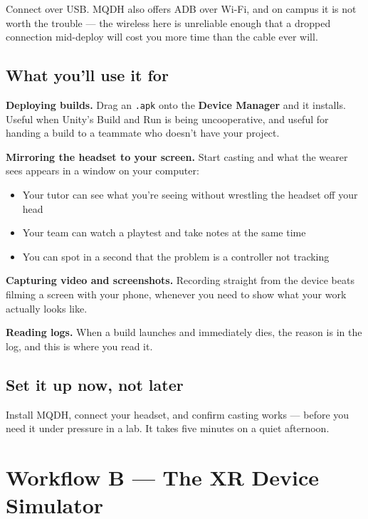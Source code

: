 \documentclass[11pt,a4paper]{article}
\providecommand{\tightlist}{\setlength{\itemsep}{2pt}\setlength{\parskip}{0pt}}
\begin{document}
Connect over USB. MQDH also offers ADB over Wi-Fi, and on campus it is not worth the
trouble --- the wireless here is unreliable enough that a dropped connection mid-deploy will
cost you more time than the cable ever will.

\subsection{What you'll use it for}\label{what-youll-use-it-for}

\textbf{Deploying builds.} Drag an \texttt{.apk} onto the \textbf{Device Manager} and it installs. Useful
when Unity's Build and Run is being uncooperative, and useful for handing a build to a
teammate who doesn't have your project.

\textbf{Mirroring the headset to your screen.} Start casting and what the wearer sees appears
in a window on your computer:

\begin{itemize}
\tightlist
\item
  Your tutor can see what you're seeing without wrestling the headset off your head
\item
  Your team can watch a playtest and take notes at the same time
\item
  You can spot in a second that the problem is a controller not tracking
\end{itemize}

\textbf{Capturing video and screenshots.} Recording straight from the device beats filming a
screen with your phone, whenever you need to show what your work actually looks like.

\textbf{Reading logs.} When a build launches and immediately dies, the reason is in the log,
and this is where you read it.

\subsection{Set it up now, not later}\label{set-it-up-now-not-later}

Install MQDH, connect your headset, and confirm casting works --- before you need it under
pressure in a lab. It takes five minutes on a quiet afternoon.


\section{Workflow B --- The XR Device Simulator}\label{workflow-b-the-xr-device-simulator}
\end{document}
